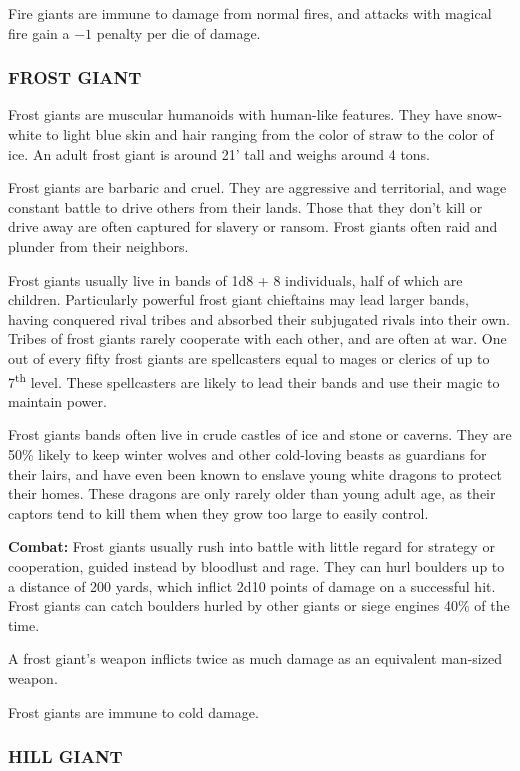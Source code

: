 \begin{multicols}{2}
Fire giants are immune to damage from normal fires, and attacks with magical fire gain a $-1$ penalty per die of damage.

\subsubsection{FROST GIANT}

Frost giants are muscular humanoids with human-like features. They have snow-white to light blue skin and hair ranging from the color of straw to the color of ice. An adult frost giant is around 21' tall and weighs around 4 tons.

Frost giants are barbaric and cruel. They are aggressive and territorial, and wage constant battle to drive others from their lands. Those that they don't kill or drive away are often captured for slavery or ransom. Frost giants often raid and plunder from their neighbors.

Frost giants usually live in bands of 1d8 + 8 individuals, half of which are children. Particularly powerful frost giant chieftains may lead larger bands, having conquered rival tribes and absorbed their subjugated rivals into their own. Tribes of frost giants rarely cooperate with each other, and are often at war. One out of every fifty frost giants are spellcasters equal to mages or clerics of up to 7\textsuperscript{th} level. These spellcasters are likely to lead their bands and use their magic to maintain power.

Frost giants bands often live in crude castles of ice and stone or caverns. They are 50\% likely to keep winter wolves and other cold-loving beasts as guardians for their lairs, and have even been known to enslave young white dragons to protect their homes. These dragons are only rarely older than young adult age, as their captors tend to kill them when they grow too large to easily control.

\textbf{Combat:} Frost giants usually rush into battle with little regard for strategy or cooperation, guided instead by bloodlust and rage. They can hurl boulders up to a distance of 200 yards, which inflict 2d10 points of damage on a successful hit. Frost giants can catch boulders hurled by other giants or siege engines 40\% of the time.

A frost giant's weapon inflicts twice as much damage as an equivalent man-sized weapon.

Frost giants are immune to cold damage.

\subsubsection{HILL GIANT}


\end{multicols}
